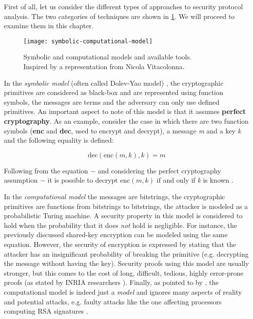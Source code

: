 First of all, let us consider the different types of approaches to security protocol analysis. The two categories of techniques are shown in \cref{fig:symbolic-computational-model}. We will proceed to examine them in this chapter.

\begin{figure}[t]
    \texttt{[image: symbolic-computational-model]}
    \centering
    \caption{Symbolic and computational models and available tools.\\Inspired by a representation from Nicola Vitacolonna.}
    \label{fig:symbolic-computational-model}
\end{figure}

In the \textit{symbolic model} (often called Dolev-Yao model) \cite{Dolev-Yao}, the cryptographic primitives are considered as black-box and are represented using function symbols, the messages are terms and the adversary can only use defined primitives. An important aspect to note of this model is that it assumes \textbf{perfect cryptography}. As an example, consider the case in which there are two function symbols (\textbf{enc} and \textbf{dec}, used to encrypt and decrypt), a message \textit{m} and a key \textit{k} and the following equality is defined:

\begin{equation}
    \mbox{dec}\left(\mbox{enc}\left(m, k\right), k\right) = m
\end{equation}

Following from the equation $-$ and considering the perfect cryptography assumption $-$ it is possible to decrypt $\mbox{enc}\left(m, k\right)$ if and only if \textit{k} is known \cite{SymbolicComputationalBlanchet}.

In the \textit{computational model} the messages are bitstrings, the cryptographic primitives are functions from bitstrings to bitstrings, the attacker is modeled as a probabilistic Turing machine.
A security property in this model is considered to hold when the probability that it does \textit{not} hold is negligible. For instance, the previously discussed shared-key encryption can be modeled using the same equation. However, the security of encryption is expressed by stating that the attacker has an insignificant probability of breaking the primitive (e.g. decrypting the message without having the key). Security proofs using this model are usually stronger, but this comes to the cost of long, difficult, tedious, highly error-prone proofs (as stated by INRIA researchers \cite{ComputationalAnalysisCryptoSystemsINRIA}). Finally, as pointed to by \BLANC{} \cite{SymbolicComputationalBlanchet}, the computational model is indeed just a \textit{model} and ignores many aspects of reality and potential attacks, e.g. faulty attacks like the one affecting processors computing RSA signatures \cite{RSAFaultAttack}.

